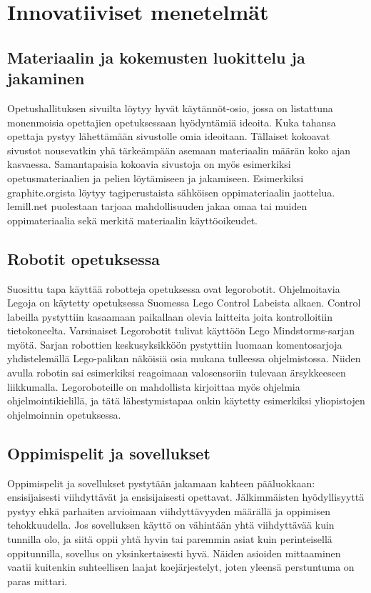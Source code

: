 \documentclass[utf8,bachelor]{gradu3}
\begin{document}



\chapter{Innovatiiviset menetelmät}

\section{Materiaalin ja kokemusten luokittelu ja jakaminen}
Opetushallituksen sivuilta löytyy hyvät käytännöt-osio, jossa on listattuna monenmoisia opettajien opetuksessaan hyödyntämiä ideoita. \parencite[][]{hyvatkaytannot} Kuka tahansa opettaja pystyy lähettämään sivustolle omia ideoitaan. Tällaiset kokoavat sivustot nousevatkin yhä tärkeämpään asemaan materiaalin määrän koko ajan kasvaessa. Samantapaisia kokoavia sivustoja on myös esimerkiksi opetusmateriaalien ja pelien löytämiseen ja jakamiseen. Esimerkiksi graphite.orgista löytyy tagiperustaista sähköisen oppimateriaalin jaottelua. lemill.net puolestaan tarjoaa mahdollisuuden jakaa omaa tai muiden oppimateriaalia sekä merkitä materiaalin käyttöoikeudet.

\section{Robotit opetuksessa}
Suosittu tapa käyttää robotteja opetuksessa ovat legorobotit. Ohjelmoitavia Legoja on käytetty opetuksessa Suomessa  Lego Control Labeista alkaen. \parencite[][]{skrolliRobot} Control labeilla pystyttiin kasaamaan paikallaan olevia laitteita joita kontrolloitiin tietokoneelta. Varsinaiset Legorobotit tulivat käyttöön Lego Mindstorms-sarjan myötä. Sarjan robottien keskusyksikköön pystyttiin luomaan komentosarjoja yhdistelemällä Lego-palikan näköisiä osia mukana tulleessa ohjelmistossa. Niiden avulla robotin sai esimerkiksi reagoimaan valosensoriin tulevaan ärsykkeeseen liikkumalla. Legoroboteille on mahdollista kirjoittaa myös ohjelmia ohjelmointikielillä, ja tätä lähestymistapaa onkin käytetty esimerkiksi yliopistojen ohjelmoinnin opetuksessa. \parencite[][]{korppirobo} \parencite[][]{hesarobo}

\section{Oppimispelit ja sovellukset}
Oppimispelit ja sovellukset pystytään jakamaan kahteen pääluokkaan: ensisijaisesti viihdyttävät ja ensisijaisesti opettavat. Jälkimmäisten hyödyllisyyttä pystyy ehkä parhaiten arvioimaan viihdyttävyyden määrällä ja oppimisen tehokkuudella. Jos sovelluksen käyttö on vähintään yhtä viihdyttävää kuin tunnilla olo, ja siitä oppii yhtä hyvin tai paremmin asiat kuin perinteisellä oppitunnilla, sovellus on yksinkertaisesti hyvä. Näiden asioiden mittaaminen vaatii kuitenkin suhteellisen laajat koejärjestelyt, joten yleensä perstuntuma on paras mittari.
\end{document}
